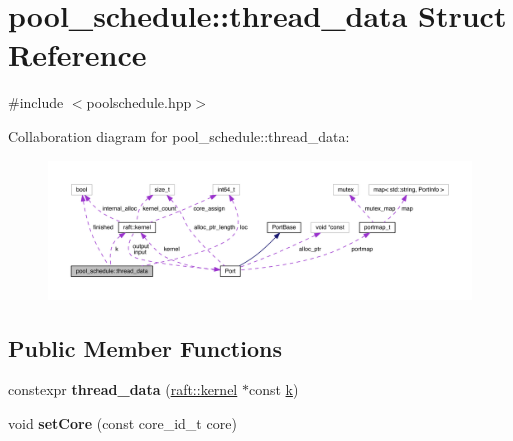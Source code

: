 \hypertarget{structpool__schedule_1_1thread__data}{}\section{pool\+\_\+schedule\+:\+:thread\+\_\+data Struct Reference}
\label{structpool__schedule_1_1thread__data}


{\ttfamily \#include $<$poolschedule.\+hpp$>$}



Collaboration diagram for pool\+\_\+schedule\+:\+:thread\+\_\+data\+:
\nopagebreak
\begin{figure}[H]
\begin{center}
\leavevmode
\includegraphics[width=350pt]{structpool__schedule_1_1thread__data__coll__graph}
\end{center}
\end{figure}
\subsection*{Public Member Functions}
\begin{DoxyCompactItemize}
\item 
\hypertarget{structpool__schedule_1_1thread__data_a3fe4fd727e03bd59231a3b56fc6eb929}{}\label{structpool__schedule_1_1thread__data_a3fe4fd727e03bd59231a3b56fc6eb929} 
constexpr {\bfseries thread\+\_\+data} (\hyperlink{classraft_1_1kernel}{raft\+::kernel} $\ast$const \hyperlink{structpool__schedule_1_1thread__data_ada8a6411993a2c90bb16503777bf4b00}{k})
\item 
\hypertarget{structpool__schedule_1_1thread__data_a62f05162905105650279d661f55dae18}{}\label{structpool__schedule_1_1thread__data_a62f05162905105650279d661f55dae18} 
void {\bfseries set\+Core} (const core\+\_\+id\+\_\+t core)
\end{DoxyCompactItemize}
